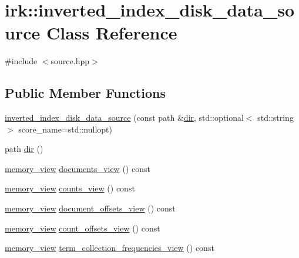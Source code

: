 \hypertarget{classirk_1_1inverted__index__disk__data__source}{}\section{irk\+:\+:inverted\+\_\+index\+\_\+disk\+\_\+data\+\_\+source Class Reference}
\label{classirk_1_1inverted__index__disk__data__source}


{\ttfamily \#include $<$source.\+hpp$>$}

\subsection*{Public Member Functions}
\begin{DoxyCompactItemize}
\item 
\mbox{\hyperlink{classirk_1_1inverted__index__disk__data__source_a78792caa259afbae7e95dc0565530388}{inverted\+\_\+index\+\_\+disk\+\_\+data\+\_\+source}} (const path \&\mbox{\hyperlink{classirk_1_1inverted__index__disk__data__source_afb9f4d12a7141c44d7a9d0a4f94b2d36}{dir}}, std\+::optional$<$ std\+::string $>$ score\+\_\+name=std\+::nullopt)
\item 
path \mbox{\hyperlink{classirk_1_1inverted__index__disk__data__source_afb9f4d12a7141c44d7a9d0a4f94b2d36}{dir}} ()
\item 
\mbox{\hyperlink{classirk_1_1memory__view}{memory\+\_\+view}} \mbox{\hyperlink{classirk_1_1inverted__index__disk__data__source_ae3bcd94eb76e6f255f2435c7d461447a}{documents\+\_\+view}} () const
\item 
\mbox{\hyperlink{classirk_1_1memory__view}{memory\+\_\+view}} \mbox{\hyperlink{classirk_1_1inverted__index__disk__data__source_ab2667f134c752dbed402d764479232ed}{counts\+\_\+view}} () const
\item 
\mbox{\hyperlink{classirk_1_1memory__view}{memory\+\_\+view}} \mbox{\hyperlink{classirk_1_1inverted__index__disk__data__source_a0a94db441eaa00c86b1b209fd9c0106d}{document\+\_\+offsets\+\_\+view}} () const
\item 
\mbox{\hyperlink{classirk_1_1memory__view}{memory\+\_\+view}} \mbox{\hyperlink{classirk_1_1inverted__index__disk__data__source_ac375c66656c0072e233253b765790c80}{count\+\_\+offsets\+\_\+view}} () const
\item 
\mbox{\hyperlink{classirk_1_1memory__view}{memory\+\_\+view}} \mbox{\hyperlink{classirk_1_1inverted__index__disk__data__source_a5b70c1f7fe9a770cf3a757cc8a9bda0c}{term\+\_\+collection\+\_\+frequencies\+\_\+view}} () const

\end{DoxyCompactItemize}
